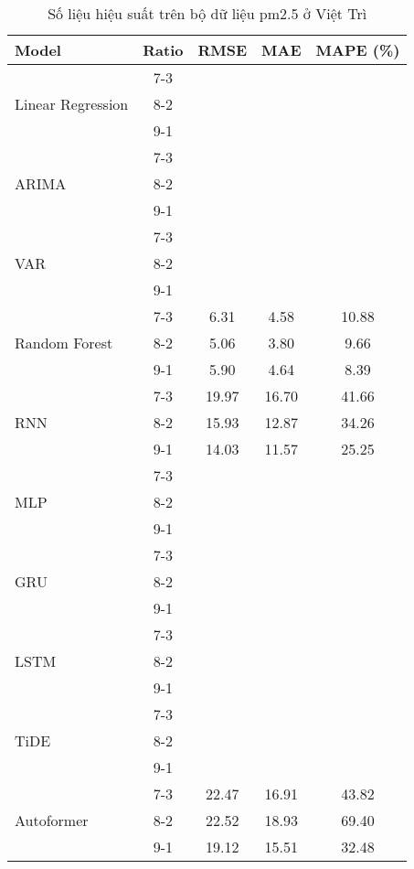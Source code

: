 \begin{table}[h!]
    \centering
    \caption{Số liệu hiệu suất trên bộ dữ liệu pm2.5 ở Việt Trì}
    \begin{tabular}{|l|c|c|c|c|}
    \hline
    \rowcolor{orange!30} \textbf{Model} & \textbf{Ratio} & \textbf{RMSE} & \textbf{MAE} & \textbf{MAPE (\%)} \\ \hline
    \rowcolor{white} & 7-3 &  &  &  \\ 
    \rowcolor{white} Linear Regression & 8-2 &  &  &  \\ 
    \rowcolor{white} & 9-1 &  &  &  \\ \hline
    \rowcolor{white} & 7-3 &  &  &  \\ 
    \rowcolor{white} ARIMA & 8-2 &  &  &  \\ 
    \rowcolor{white} & 9-1 &  &  &  \\ \hline
    \rowcolor{white} & 7-3 &  &  &  \\ 
    \rowcolor{white} VAR & 8-2 &  &  &  \\ 
    \rowcolor{white} & 9-1 &  &  & \\ \hline
    \rowcolor{white} & 7-3 & 6.31 & 4.58 & 10.88 \\ 
    \rowcolor{white} Random Forest & 8-2 & 5.06 & 3.80 & 9.66 \\ 
    \rowcolor{white} & 9-1 & 5.90 & 4.64 & 8.39 \\ \hline
    \rowcolor{white}  & 7-3 & 19.97 & 16.70 & 41.66 \\ 
    \rowcolor{white} RNN & 8-2 & 15.93 & 12.87 & 34.26 \\ 
    \rowcolor{white}  & 9-1 & 14.03 & 11.57 & 25.25 \\ \hline
    \rowcolor{white} & 7-3 &  &  &  \\ 
    \rowcolor{white} MLP & 8-2 &  &  &  \\ 
    \rowcolor{white} & 9-1 &  &  &  \\ \hline
    \rowcolor{white} & 7-3 &  &  &  \\ 
    \rowcolor{white} GRU & 8-2 &  &  &  \\ 
    \rowcolor{white} & 9-1 &  &  &  \\ \hline
    \rowcolor{white} & 7-3 &  &  &  \\ 
    \rowcolor{white} LSTM & 8-2 &  &  &  \\ 
    \rowcolor{white} & 9-1 &  &  &  \\ \hline
    \rowcolor{white!30} & 7-3 &  &  &  \\ 
    \rowcolor{white!30} TiDE & 8-2 &  &  &  \\ 
    \rowcolor{white!30} & 9-1 &  &  &  \\ \hline
    \rowcolor{white}  & 7-3 & 22.47 & 16.91 & 43.82 \\ 
    \rowcolor{white} Autoformer & 8-2 & 22.52 & 18.93 & 69.40 \\ 
    \rowcolor{white}  & 9-1 & 19.12 & 15.51 & 32.48 \\ \hline

    \end{tabular}
\end{table}